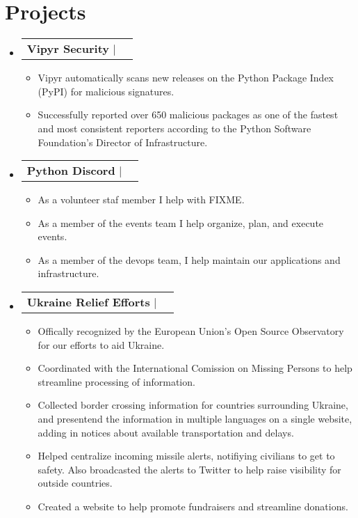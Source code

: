 \documentclass[letterpaper,11pt]{article}
\makeatletter
\let\emph\relax
\newcommand{\resumeItem}[1]{
  \item\small{
    {#1 \vspace{-2pt}}
  }
}
\newcommand{\resumeProjectHeading}[2]{
    \item
    \begin{tabular*}{0.97\textwidth}{l@{\extracolsep{\fill}}r}
      \small#1 & #2 \\
    \end{tabular*}\vspace{-7pt}
}
\newcommand{\resumeSubheadingListStart}{\begin{itemize}[leftmargin=0.15in, label={}]}
\newcommand{\resumeSubheadingListEnd}{\end{itemize}}
\newcommand{\resumeItemListStart}{\begin{itemize}}
\newcommand{\resumeItemListEnd}{\end{itemize}}
\makeatother
\begin{document}
\section{Projects}
    \resumeSubheadingListStart
        \resumeProjectHeading{\textbf{Vipyr Security} $|$ \emph{Python, GitHub Actions, Kubernetes, Sentry}}{}
        \resumeItemListStart
            \resumeItem{Vipyr automatically scans new releases on the Python Package Index (PyPI) for malicious signatures.}
            \resumeItem{Successfully reported over 650 malicious packages as
            one of the fastest and most consistent reporters according to the
        Python Software Foundation's Director of Infrastructure.}
        \resumeItemListEnd
    \resumeSubheadingListEnd
    \resumeSubheadingListStart
        \resumeProjectHeading{\textbf{Python Discord} $|$ \emph{Python, GitHub Actions, Kubernetes, Sentry}}{}
        \resumeItemListStart
            \resumeItem{As a volunteer staf member I help with FIXME.}
            \resumeItem{As a member of the events team I help organize, plan, and execute events.}
            \resumeItem{As a member of the devops team, I help maintain our applications and infrastructure.}
        \resumeItemListEnd
    \resumeSubheadingListEnd
    \resumeSubheadingListStart
        \resumeProjectHeading{\textbf{Ukraine Relief Efforts} $|$ \emph{GitHub Actions, Vercel, Sentry}}{}
        \resumeItemListStart
            \resumeItem{Offically recognized by the European Union's Open Source Observatory for 
              our efforts to aid Ukraine.}
            \resumeItem{Coordinated with the International Comission on Missing Persons to help
              streamline processing of information.}
            \resumeItem{Collected border crossing information for countries surrounding Ukraine, 
              and presentend the information in multiple languages on a single website, 
              adding in notices about available transportation and delays.}
            \resumeItem{Helped centralize incoming missile alerts, notifiying civilians to get to safety. 
              Also broadcasted the alerts to Twitter to help raise visibility for outside countries.}
            \resumeItem{Created a website to help promote fundraisers and streamline donations.}
        \resumeItemListEnd
    \resumeSubheadingListEnd
\end{document}
